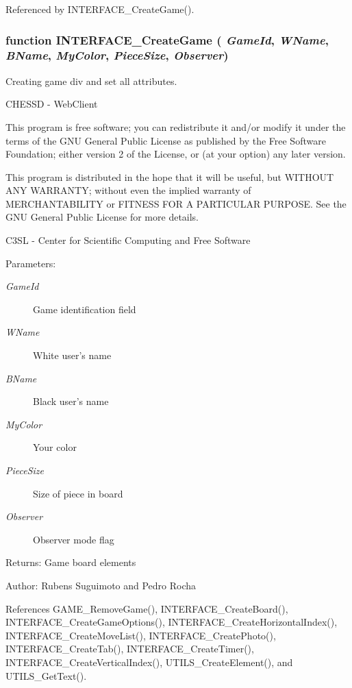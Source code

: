 Referenced by INTERFACE\_\-CreateGame().
\subsubsection[INTERFACE\_\-CreateGame]{\setlength{\rightskip}{0pt plus 5cm}function INTERFACE\_\-CreateGame ( {\em GameId}, \/   {\em WName}, \/   {\em BName}, \/   {\em MyColor}, \/   {\em PieceSize}, \/   {\em Observer})}\label{board_8js_ff22cbb5485e10d04e8d66580203b194}


Creating game div and set all attributes. 

CHESSD - WebClient

This program is free software; you can redistribute it and/or modify it under the terms of the GNU General Public License as published by the Free Software Foundation; either version 2 of the License, or (at your option) any later version.

This program is distributed in the hope that it will be useful, but WITHOUT ANY WARRANTY; without even the implied warranty of MERCHANTABILITY or FITNESS FOR A PARTICULAR PURPOSE. See the GNU General Public License for more details.

C3SL - Center for Scientific Computing and Free Software \begin{Desc}
\item[Parameters:]
\begin{description}
\item[{\em GameId}]Game identification field \item[{\em WName}]White user's name \item[{\em BName}]Black user's name \item[{\em MyColor}]Your color \item[{\em PieceSize}]Size of piece in board \item[{\em Observer}]Observer mode flag \end{description}
\end{Desc}
\begin{Desc}
\item[Returns:]Game board elements \end{Desc}
\begin{Desc}
\item[Author:]Rubens Suguimoto and Pedro Rocha \end{Desc}


References GAME\_\-RemoveGame(), INTERFACE\_\-CreateBoard(), INTERFACE\_\-CreateGameOptions(), INTERFACE\_\-CreateHorizontalIndex(), INTERFACE\_\-CreateMoveList(), INTERFACE\_\-CreatePhoto(), INTERFACE\_\-CreateTab(), INTERFACE\_\-CreateTimer(), INTERFACE\_\-CreateVerticalIndex(), UTILS\_\-CreateElement(), and UTILS\_\-GetText().

